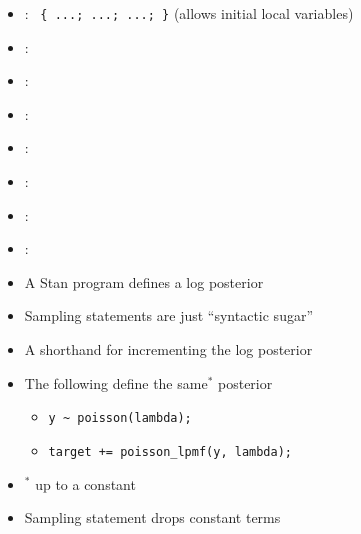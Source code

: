 \documentclass[10pt]{report}
\begin{document}
%
\begin{itemize}
\item {}: \ {\footnotesize \Verb|{ ...; ...; ...; }|}
  \hfill {\footnotesize
    (allows initial local variables)}
\end{itemize}

%
\begin{itemize}
\item {}: \ {\footnotesize {}}
\item {}: \ {\footnotesize {}}
\item {}: \ {\footnotesize
    }
\item {}: \ {\footnotesize {}}
\item {}: \ {\footnotesize {}}
\end{itemize}

%
\begin{itemize}
\item {}: \ {\footnotesize {}}
\item {}:
\ {\footnotesize
    }
\end{itemize}


%
\begin{itemize}
\item A Stan program defines a log posterior
\item Sampling statements are just ``syntactic sugar''
\item A shorthand for incrementing the log posterior
\item The following define the same$^*$ posterior
\begin{itemize}
\item \Verb|y ~ poisson(lambda);|
\item \Verb|target += poisson_lpmf(y, lambda);|
\end{itemize}
\item ${}^{*}$ up to a constant
\item Sampling statement drops constant terms
\end{itemize}
\end{document}
